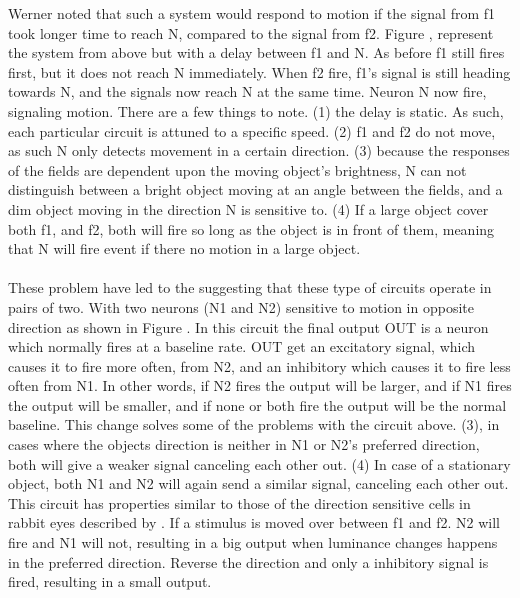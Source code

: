 \documentclass[11pt,a4paper,oneside,table,xcdraw]{article}
\begin{document}
Werner \cite{beetle} noted that such a system would respond to motion if the signal from f1 took longer time to reach N, compared to the signal from f2. Figure , represent the system from above but with a delay between f1 and N. As before f1 still fires first, but it does not reach N immediately. When f2 fire, f1's signal is still heading towards N, and the signals now reach N at the same time. Neuron N now fire, signaling motion. There are a few things to note. (1) the delay is static. As such, each particular circuit is attuned to a specific speed. (2) f1 and f2 do not move, as such N only detects movement in a certain direction. (3) because the responses of the fields are dependent upon the moving object's brightness, N can not distinguish between a bright object moving at an angle between the fields, and a dim object moving in the direction N is sensitive to. (4) If a large  object cover both f1, and f2, both will fire so long as the object is in front of them, meaning that N will fire event if there no motion in a large object.
\\\\
These problem have led to the suggesting that these type of circuits operate in pairs of two. With two neurons (N1 and N2) sensitive to motion in opposite direction as shown in Figure . In this circuit the final output OUT is a neuron which normally fires at a baseline rate. OUT get an excitatory signal, which causes it to fire more often, from N2, and an inhibitory which causes it to fire less often from N1. In other words, if N2 fires the output will be larger, and if N1 fires the output will be smaller, and if none or both fire the output will be the normal baseline. This change solves some of the problems with the circuit above. (3), in cases where the objects direction is neither in N1 or N2's preferred direction, both will give a weaker signal canceling each other out. (4) In case of a stationary object, both N1 and N2 will again send a similar signal, canceling each other out. This circuit has properties similar to those of the direction sensitive cells in rabbit eyes described by \cite{Barlow1965}. If a stimulus is moved over between f1 and f2. N2 will fire and N1 will not, resulting in a big output when luminance changes happens in the preferred direction. Reverse the direction and only a inhibitory signal is fired, resulting in a small output.
\end{document}
